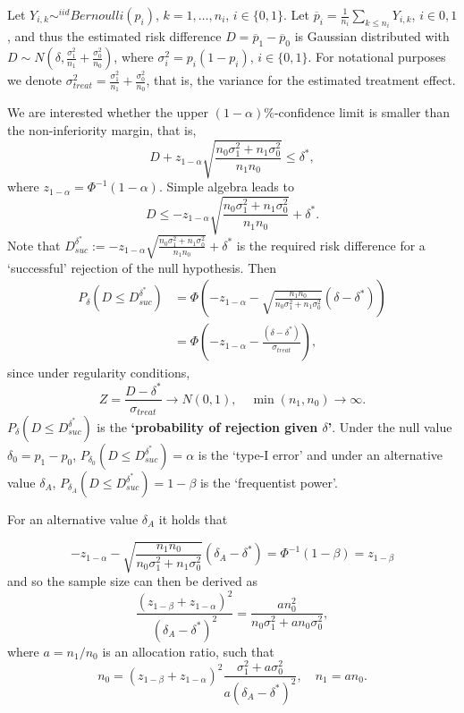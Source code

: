 \documentclass[
]{book}
\begin{document}
Let \(Y_{i,k} \sim^{iid} Bernoulli(p_i)\), \(k=1,\dots,n_i\), \(i\in \{0,1\}\). Let \(\overline p_i=\frac{1}{n_i}\sum_{k\leq n_i} Y_{i,k}\), \(i\in {0,1}\), and thus the estimated risk difference \(D=\overline p_1-\overline p_0\) is Gaussian distributed with \(D \sim N\left(\delta, \frac{\sigma_1^2}{n_1}+\frac{\sigma_0^2}{n_0}\right)\), where \(\sigma_i^2=p_i(1-p_i)\), \(i\in \{0,1\}\). For notational purposes we denote \(\sigma_{treat}^2=\frac{\sigma_1^2}{n_1}+\frac{\sigma_0^2}{n_0}\), that is, the variance for the estimated treatment effect.

We are interested whether the upper \((1-\alpha)\%\)-confidence limit is smaller than the non-inferiority margin, that is,
\[
D+z_{1-\alpha}\sqrt{\frac{n_0\sigma_1^2+n_1\sigma_0^2}{n_1n_0}}\leq \delta^*,
\]
where \(z_{1-\alpha}=\Phi^{-1}(1-\alpha)\). Simple algebra leads to
\[
D\leq -z_{1-\alpha}\sqrt{\frac{n_0\sigma_1^2+n_1\sigma_0^2}{n_1n_0}}+\delta^*.
\]
Note that \(D_{suc}^{\delta^*}:=-z_{1-\alpha}\sqrt{\frac{n_0\sigma_1^2+n_1\sigma_0^2}{n_1n_0}}+\delta^*\) is the required risk difference for a `successful' rejection of the null hypothesis. Then
\[
\begin{aligned}
P_\delta(D\leq D_{suc}^{\delta^*})&=\Phi\left(-z_{1-\alpha}-\sqrt{\frac{n_1n_0}{n_0\sigma_1^2+n_1\sigma_0^2}}(\delta-\delta^*)\right) \\
&=\Phi\left(-z_{1-\alpha}-\frac{(\delta-\delta^*)}{\sigma_{treat}}\right),
\end{aligned}
\]
since under regularity conditions,
\[
Z=\frac{D-\delta^*}{\sigma_{treat}} \rightarrow N(0,1), \quad \min(n_1,n_0) \rightarrow \infty.
\]
\(P_{\delta}(D\leq D_{suc}^{\delta^*})\) is the \textbf{`probability of rejection given \(\delta\)'}. Under the null value \(\delta_0=p_1-p_0\), \(P_{\delta_0}(D\leq D_{suc}^{\delta^*})=\alpha\) is the `type-I error' and under an alternative value \(\delta_A\), \(P_{\delta_A}(D\leq D_{suc}^{\delta^*})=1-\beta\) is the `frequentist power'.

For an alternative value \(\delta_A\) it holds that

\[
-z_{1-\alpha}-\sqrt{\frac{n_1n_0}{n_0\sigma_1^2+n_1\sigma_0^2}}(\delta_A-\delta^*)=\Phi^{-1}(1-\beta)=z_{1-\beta}
\]
and so the sample size can then be derived as
\[
\frac{(z_{1-\beta}+z_{1-\alpha})^2}{(\delta_A-\delta^*)^2}=\frac{an_0^2}{n_0\sigma_1^2+an_0\sigma_0^2},
\]
where \(a=n_1/n_0\) is an allocation ratio, such that
\[
n_0=(z_{1-\beta}+z_{1-\alpha})^2\frac{\sigma_1^2+a\sigma_0^2}{a(\delta_A-\delta^*)^2}, \quad n_1=an_0.
\]
\end{document}
